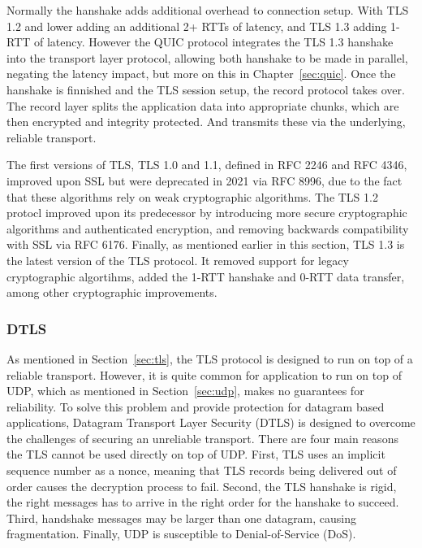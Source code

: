\documentclass[english, 12pt, a4paper, elec, utf8, a-2b, online]{aaltothesis}
\begin{document}
Normally the hanshake adds additional overhead to connection setup. With TLS 1.2 and
lower adding an additional 2+ RTTs of latency, and TLS 1.3 adding 1-RTT of latency.
However the QUIC protocol integrates the TLS 1.3 hanshake into the transport layer protocol,
allowing both hanshake to be made in parallel, negating the latency impact, but more
on this in Chapter~\ref{sec:quic}. Once the hanshake is finnished and the TLS session setup,
the record protocol takes over. The record layer splits the application data into
appropriate chunks, which are then encrypted and integrity protected. And transmits
these via the underlying, reliable transport. 

The first versions of TLS, TLS 1.0 and 1.1, defined in RFC 2246\cite{rfc2246} and
RFC 4346\cite{rfc4346}, improved upon SSL but were deprecated in 2021 via RFC 8996\cite{rfc8996},
due to the fact that these algorithms rely on weak cryptographic algorithms. The TLS 1.2
protocl improved upon its predecessor by introducing more secure cryptographic algorithms and
authenticated encryption\cite{rfc5246}, and removing backwards compatibility with
SSL via RFC 6176\cite{rfc6176}. Finally, as mentioned earlier in this section,
TLS 1.3 is the latest version of the TLS protocol. It removed support for legacy
cryptographic algortihms, added the 1-RTT hanshake and 0-RTT data transfer, among other
cryptographic improvements\cite{rfc8446}.

\subsubsection{DTLS}

As mentioned in Section~\ref{sec:tls}, the TLS protocol is designed to run on top
of a reliable transport. However, it is quite common for application to run on top
of UDP, which as mentioned in Section~\ref{sec:udp}, makes no guarantees for reliability.
To solve this problem and provide protection for datagram based applications,
Datagram Transport Layer Security (DTLS) is designed to overcome the challenges
of securing an unreliable transport. There are four main reasons the TLS cannot
be used directly on top of UDP. First, TLS uses an implicit sequence number as a
nonce, meaning that TLS records being delivered out of order causes the decryption
process to fail. Second, the TLS hanshake is rigid, the right messages has to arrive
in the right order for the hanshake to succeed. Third, handshake messages may be 
larger than one datagram, causing fragmentation. Finally, UDP is susceptible to
Denial-of-Service (DoS)\cite{rfc9147}.
\end{document}
